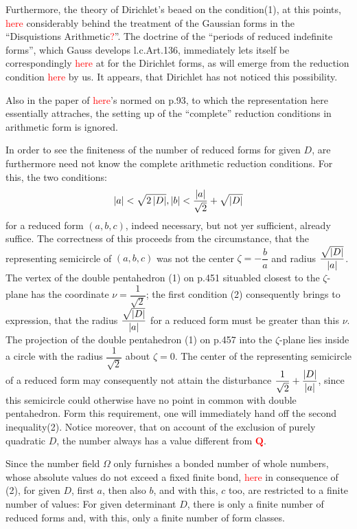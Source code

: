 Furthermore, the theory of Dirichlet’s beaed on the condition(1), at this points, \textcolor{red}{here} considerably behind the treatment of the Gaussian forms in the “Disquistions Arithmetic\textcolor{red}{?}”. The doctrine of the “periods of reduced indefinite forms”, which Gauss develops l.c.Art.136, immediately lets itself be correspondingly \textcolor{red}{here} at for the Dirichlet forms, as will emerge from the reduction condition \textcolor{red}{here} by us. It appears, that Dirichlet has not noticed this possibility.

Also in the paper of \textcolor{red}{here}’s normed on p.93, to which the representation here essentially attraches, the setting up of the “complete” reduction conditions in arithmetic form is ignored.

In order to see the finiteness of the number of reduced forms for given $D$, are furthermore need not know the complete arithmetic reduction conditions. For this, the two conditions:
\begin{align}
	\left|a\right|<\sqrt{2\left|D\right|},\left|b\right|<\frac{\left|a\right|}{\sqrt{2}}+\sqrt{\left|D\right|}
\end{align}
for a reduced form $(a,b,c)$, indeed necessary, but not yer sufficient, already suffice. The correctness of this proceeds from the circumstance, that the representing semicircle of $(a,b,c)$ was not the center $\zeta=-\dfrac{b}{a}$ and radius $\dfrac{\sqrt{\left|D\right|}}{\left|a\right|}$. The vertex of the double pentahedron (1) on p.451 situabled closest to the $\zeta$-plane has the coordinate $\nu=\dfrac{1}{\sqrt{2}}$; the first condition (2) consequently brings to expression, that the radius $\dfrac{\sqrt{\left|D\right|}}{\left|a\right|}$ for a reduced form must be greater than this $\nu$. The projection of the double pentahedron (1) on p.457 into the $\zeta$-plane lies inside a circle with the radius $\dfrac{1}{\sqrt{2}}$ about $\zeta=0$. The center of the representing semicircle of a reduced form may consequently not attain the disturbance $\dfrac{1}{\sqrt{2}}+\dfrac{\left|D\right|}{\left|a\right|}$, since this semicircle could otherwise have no point in common with double pentahedron. Form this requirement, one will immediately hand off the second inequality(2). Notice moreover, that on account of the exclusion of purely quadratic $D$, the number always has a value different from \textcolor{red}{$\mathbf{Q}$}.

Since the number field $\Omega$ only furnishes a bonded number of whole numbers, whose absolute values do not exceed a fixed finite bond, \textcolor{red}{here} in consequence of (2), for given $D$, first $a$, then also $b$, and with this, $c$ too, are restricted to a finite number of values: For given determinant $D$, there is only a finite number of reduced forms and, with this, only a finite number of form classes.

